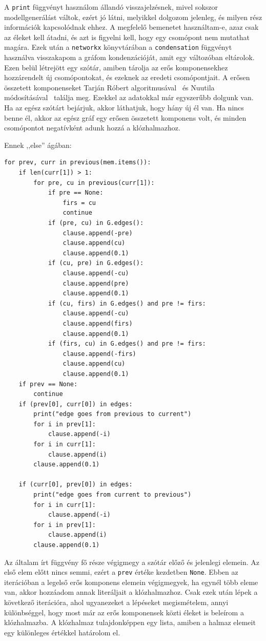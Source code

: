 \documentclass[
]{thesis-ekf}
\theoremstyle{definition}
\theoremstyle{remark}
\begin{document}
	A \texttt{print} függvényt használom állandó visszajelzésnek, mivel sokszor modellgenerálást váltok, ezért jó látni, melyikkel dolgozom jelenleg, és milyen rész információk kapcsolódnak ehhez. A megfelelő bemenetet használtam-e, azaz csak az éleket kell átadni, és azt is figyelni kell, hogy egy csomópont nem mutathat magára. Ezek után a \texttt{networkx} könyvtárában a \texttt{condensation} függvényt használva visszakapom a gráfom kondenzációját, amit egy változóban eltárolok. Ezen belül létrejött egy szótár, amiben tárolja az erős komponensekhez hozzárendelt új csomópontokat, és ezeknek az eredeti csomópontjait. A erősen összetett komponenseket Tarján Róbert algoritmusával~\cite{tarjan} és Nuutila módosításával~\cite{nuutila} találja meg. Ezekkel az adatokkal már egyszerűbb dolgunk van. Ha az egész szótárt bejárjuk, akkor láthatjuk, hogy hány új él van. Ha nincs benne él, akkor az egész gráf egy erősen összetett komponens volt, és minden csomópontot negatívként adunk hozzá a klózhalmazhoz.

	Ennek ,,else'' ágában:
	\begin{lstlisting}
for prev, curr in previous(mem.items()):
	if len(curr[1]) > 1:
		for pre, cu in previous(curr[1]):
			if pre == None:
				firs = cu
				continue
			if (pre, cu) in G.edges():
				clause.append(-pre)
				clause.append(cu)
				clause.append(0.1)
			if (cu, pre) in G.edges():
				clause.append(-cu)
				clause.append(pre)
				clause.append(0.1)
			if (cu, firs) in G.edges() and pre != firs:
				clause.append(-cu)
				clause.append(firs)
				clause.append(0.1)
			if (firs, cu) in G.edges() and pre != firs:
				clause.append(-firs)
				clause.append(cu)
				clause.append(0.1)
	if prev == None:
		continue
	if (prev[0], curr[0]) in edges:
		print("edge goes from previous to current")
		for i in prev[1]:
			clause.append(-i)
		for i in curr[1]:
			clause.append(i)
		clause.append(0.1)
	
	if (curr[0], prev[0]) in edges:
		print("edge goes from current to previous")
		for i in curr[1]:
			clause.append(-i)
		for i in prev[1]:
			clause.append(i)
		clause.append(0.1)
	\end{lstlisting}	
	
	Az általam írt függvény fő része végigmegy a szótár előző és jelenlegi elemein. Az első elem előtt nincs semmi, ezért a \texttt{prev} értéke kezdetben \texttt{None}. Ebben az iterációban a legelső erős komponens elemein végigmegyek, ha egynél több eleme van, akkor hozzáadom annak literáljait a klózhalmazhoz. Csak ezek után lépek a következő iterációra, ahol ugyanezeket a lépéseket megismételem, annyi különbséggel, hogy most már az erős komponensek közti éleket is beleírom a klózhalmazba. A klózhalmaz tulajdonképpen egy lista, amiben a halmaz elemeit egy különleges értékkel határolom el.
	
\end{document}
